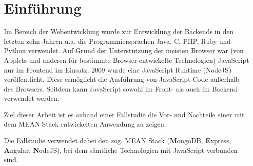 \chapter{Einführung}
\label{einfuerung-michi}

Im Bereich der Webentwicklung wurde zur Entwicklung der Backends in den
letzten zehn Jahren u.a. die Programmiersprachen Java, C, PHP, Ruby und
Python verwendet. Auf Grund der Unterstützung der meisten Browser war
(von Applets und anderen für bestimmte Browser entwickelte Technologien)
JavaScript nur im Frontend im Einsatz. 2009 wurde eine JavaScript
Runtime (NodeJS) veröffentlicht. Diese ermöglicht die Ausführung von
JavaScript Code außerhalb des Browsers. Seitdem kann JavaScript sowohl
im Front- als auch im Backend verwendet werden.

Ziel dieser Arbeit ist es anhand einer Fallstudie die Vor- und Nachteile
einer mit dem MEAN Stack entwickelten Anwendung zu zeigen.

Die Fallstudie verwendet dabei den sog. MEAN Stack (\textbf{M}ongoDB,
\textbf{E}xpress, \textbf{A}ngular, \textbf{N}odeJS), bei dem sämtliche
Technologien mit JavaScript verbunden sind.